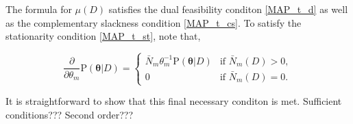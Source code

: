 \documentclass[12pt]{report}
\begin{document}
The formula for $\mu(D)$ satisfies the dual feasibility conditon \eqref{MAP_t_d} as well as the complementary slackness condition \eqref{MAP_t_cs}. To satisfy the stationarity condition \eqref{MAP_t_st}, note that,

\begin{equation}
\frac{\partial}{\partial \theta_m} \text{P}(\bm{\theta} | D) = \begin{cases} \bar{N}_m \theta_m^{-1} \text{P}(\bm{\theta} | D) & \text{if } \bar{N}_m(D) > 0, \\ 0 & \text{if } \bar{N}_m(D) = 0. \end{cases}
\end{equation}

It is straightforward to show that this final necessary conditon is met. Sufficient conditions??? Second order???

\end{document}

